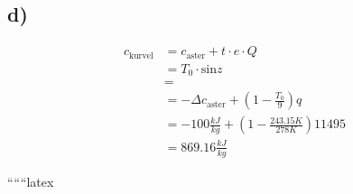 

\subsection*{d)}

\begin{align*}
c_{\text{kurvel}} &= c_{\text{aster}} + t \cdot e \cdot Q \\
&= T_0 \cdot \text{sin} z \\
&= \\
&= -\Delta c_{\text{aster}} + \left( 1 - \frac{T_0}{9} \right) q \\
&= -100 \frac{kJ}{kg} + \left( 1 - \frac{243.15 K}{278 K} \right) 11495 \\
&= 869.16 \frac{kJ}{kg}
\end{align*}

``````latex